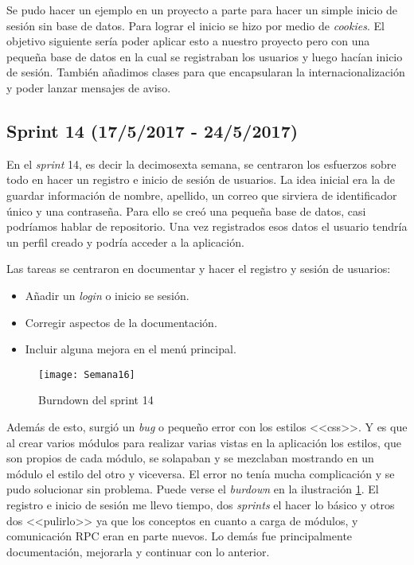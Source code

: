 Se pudo hacer un ejemplo en un proyecto a parte para hacer un simple inicio de sesión sin base de datos. Para lograr el inicio se hizo por medio de \emph{cookies}. El objetivo siguiente sería poder aplicar esto a nuestro proyecto pero con una pequeña base de datos en la cual se registraban los usuarios y luego hacían inicio de sesión. También añadimos clases para que encapsularan la internacionalización y poder lanzar mensajes de aviso.

\subsection{Sprint 14 (17/5/2017 - 24/5/2017)}

En el \emph{sprint} 14, es decir la decimosexta semana, se centraron los esfuerzos sobre todo en hacer un registro e inicio de sesión de usuarios. La idea inicial era la de guardar información de nombre, apellido, un correo que sirviera de identificador único y una contraseña. Para ello se creó una pequeña base de datos, casi podríamos hablar de repositorio. Una vez registrados esos datos el usuario tendría un perfil creado y podría acceder a la aplicación.

Las tareas se centraron en documentar y hacer el registro y sesión de usuarios:
\begin{itemize}
\item Añadir un \emph{login} o inicio se sesión.
\item Corregir aspectos de la documentación.
\item Incluir alguna mejora en el menú principal.
\end{itemize}

\begin{figure}[h]
\centering
\texttt{[image: Semana16]}
\caption{Burndown del sprint 14}
\label{fig:A.13}
\end{figure}

Además de esto, surgió un \emph{bug} o pequeño error con los estilos <<css>>. Y es que al crear varios módulos para realizar varias vistas en la aplicación los estilos, que son propios de cada módulo, se solapaban y se mezclaban mostrando en un módulo el estilo del otro y viceversa. El error no tenía mucha complicación y se pudo solucionar sin problema. Puede verse el \emph{burdown} en la ilustración \ref{fig:A.13}.
El registro e inicio de sesión me llevo tiempo, dos \emph{sprints} el hacer lo básico y otros dos <<pulirlo>> ya que los conceptos en cuanto a carga de módulos, y comunicación RPC eran en parte nuevos. Lo demás fue principalmente documentación, mejorarla y continuar con lo anterior.

